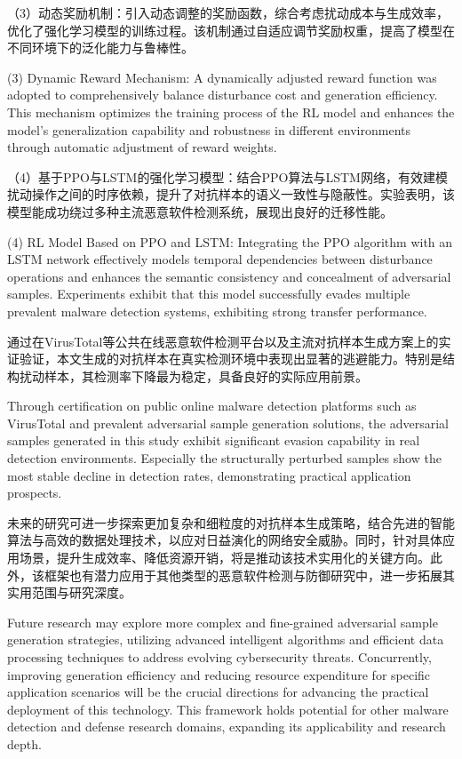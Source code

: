 \begin{conclusion}
（3）动态奖励机制：引入动态调整的奖励函数，综合考虑扰动成本与生成效率，优化了强化学习模型的训练过程。该机制通过自适应调节奖励权重，提高了模型在不同环境下的泛化能力与鲁棒性。

(3) Dynamic Reward Mechanism: A dynamically adjusted reward function was adopted to comprehensively balance disturbance cost and generation efficiency. This mechanism optimizes the training process of the RL model and enhances the model's generalization capability and robustness in different environments through automatic adjustment of reward weights.
	
（4）基于PPO与LSTM的强化学习模型：结合PPO算法与LSTM网络，有效建模扰动操作之间的时序依赖，提升了对抗样本的语义一致性与隐蔽性。实验表明，该模型能成功绕过多种主流恶意软件检测系统，展现出良好的迁移性能。

(4) RL Model Based on PPO and LSTM: Integrating the PPO algorithm with an LSTM network effectively models temporal dependencies between disturbance operations and enhances the semantic consistency and concealment of adversarial samples. Experiments exhibit that this model successfully evades multiple prevalent malware detection systems, exhibiting strong transfer performance.
	
通过在VirusTotal等公共在线恶意软件检测平台以及主流对抗样本生成方案上的实证验证，本文生成的对抗样本在真实检测环境中表现出显著的逃避能力。特别是结构扰动样本，其检测率下降最为稳定，具备良好的实际应用前景。

Through certification on public online malware detection platforms such as VirusTotal and prevalent adversarial sample generation solutions, the adversarial samples generated in this study exhibit significant evasion capability in real detection environments. Especially the structurally perturbed samples show the most stable decline in detection rates, demonstrating practical application prospects.
	
未来的研究可进一步探索更加复杂和细粒度的对抗样本生成策略，结合先进的智能算法与高效的数据处理技术，以应对日益演化的网络安全威胁。同时，针对具体应用场景，提升生成效率、降低资源开销，将是推动该技术实用化的关键方向。此外，该框架也有潜力应用于其他类型的恶意软件检测与防御研究中，进一步拓展其实用范围与研究深度。

Future research may explore more complex and fine-grained adversarial sample generation strategies, utilizing advanced intelligent algorithms and efficient data processing techniques to address evolving cybersecurity threats. Concurrently, improving generation efficiency and reducing resource expenditure for specific application scenarios will be the crucial directions for advancing the practical deployment of this technology. This framework holds potential for other malware detection and defense research domains, expanding its applicability and research depth.
\end{conclusion}
